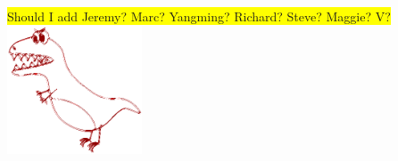 \documentclass[bg, manuscript]{copernicus}
\newcommand{\hilight}[1]{\colorbox{yellow}{#1}}
\begin{document}



\received{}
\pubdiscuss{} %
\revised{}
\accepted{}
\published{}




\maketitle

\hilight{Should I add Jeremy? Marc? Yangming? Richard? Steve? Maggie? V?}
\includegraphics[width=4cm]{figs/dino.png}
\end{document}

